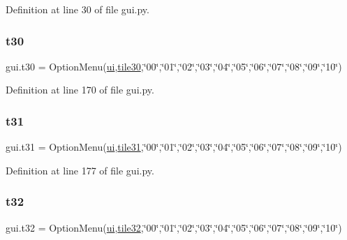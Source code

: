 Definition at line 30 of file gui.\+py.

\mbox{\label{namespacegui_a24ef5ddefbe8dca48b5e700d68e95a72}} 
\subsubsection{\texorpdfstring{t30}{t30}}
{\footnotesize\ttfamily gui.\+t30 = Option\+Menu(\mbox{\hyperlink{namespacegui_a40ab7281456eadbea2dc2038f5c24fa1}{ui}},\mbox{\hyperlink{namespacegui_af7526ad516cd07f3f2ec75d8b81287a9}{tile30}},\char`\"{}00\char`\"{},\char`\"{}01\char`\"{},\char`\"{}02\char`\"{},\char`\"{}03\char`\"{},\char`\"{}04\char`\"{},\char`\"{}05\char`\"{},\char`\"{}06\char`\"{},\char`\"{}07\char`\"{},\char`\"{}08\char`\"{},\char`\"{}09\char`\"{},\char`\"{}10\char`\"{})}



Definition at line 170 of file gui.\+py.

\mbox{\label{namespacegui_af8c8f46ca7cb86271e4bca50136a33eb}} 
\subsubsection{\texorpdfstring{t31}{t31}}
{\footnotesize\ttfamily gui.\+t31 = Option\+Menu(\mbox{\hyperlink{namespacegui_a40ab7281456eadbea2dc2038f5c24fa1}{ui}},\mbox{\hyperlink{namespacegui_a587d16eda380c21d3eddbf1fbc9716ce}{tile31}},\char`\"{}00\char`\"{},\char`\"{}01\char`\"{},\char`\"{}02\char`\"{},\char`\"{}03\char`\"{},\char`\"{}04\char`\"{},\char`\"{}05\char`\"{},\char`\"{}06\char`\"{},\char`\"{}07\char`\"{},\char`\"{}08\char`\"{},\char`\"{}09\char`\"{},\char`\"{}10\char`\"{})}



Definition at line 177 of file gui.\+py.

\mbox{\label{namespacegui_a8bc6d61d3e60b1279b71ce41f9caca91}} 
\subsubsection{\texorpdfstring{t32}{t32}}
{\footnotesize\ttfamily gui.\+t32 = Option\+Menu(\mbox{\hyperlink{namespacegui_a40ab7281456eadbea2dc2038f5c24fa1}{ui}},\mbox{\hyperlink{namespacegui_a54c6af9760148973c56dea68ffa9b9c7}{tile32}},\char`\"{}00\char`\"{},\char`\"{}01\char`\"{},\char`\"{}02\char`\"{},\char`\"{}03\char`\"{},\char`\"{}04\char`\"{},\char`\"{}05\char`\"{},\char`\"{}06\char`\"{},\char`\"{}07\char`\"{},\char`\"{}08\char`\"{},\char`\"{}09\char`\"{},\char`\"{}10\char`\"{})}



